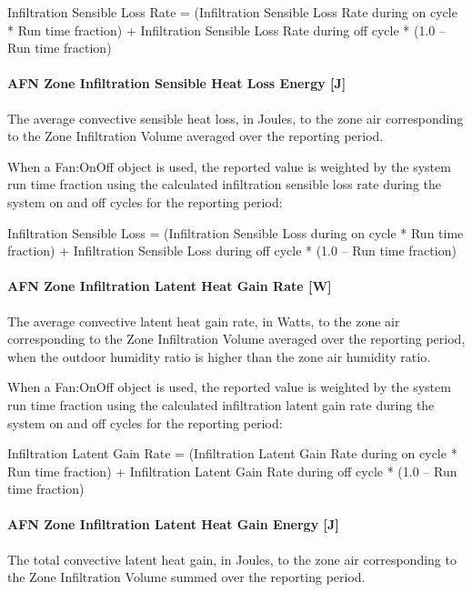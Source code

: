 Infiltration Sensible Loss Rate = (Infiltration Sensible Loss Rate during on cycle * Run time fraction) + Infiltration Sensible Loss Rate during off cycle * (1.0 -- Run time fraction)

\paragraph{AFN Zone Infiltration Sensible Heat Loss Energy {[}J{]}}\label{afn-zone-infiltration-sensible-heat-loss-energy-j}

The average convective sensible heat loss, in Joules, to the zone air corresponding to the Zone Infiltration Volume averaged over the reporting period.

When a Fan:OnOff object is used, the reported value is weighted by the system run time fraction using the calculated infiltration sensible loss rate during the system on and off cycles for the reporting period:

Infiltration Sensible Loss = (Infiltration Sensible Loss during on cycle * Run time fraction) + Infiltration Sensible Loss during off cycle * (1.0 -- Run time fraction)

\paragraph{AFN Zone Infiltration Latent Heat Gain Rate {[}W{]}}\label{afn-zone-infiltration-latent-heat-gain-rate-w}

The average convective latent heat gain rate, in Watts, to the zone air corresponding to the Zone Infiltration Volume averaged over the reporting period, when the outdoor humidity ratio is higher than the zone air humidity ratio.

When a Fan:OnOff object is used, the reported value is weighted by the system run time fraction using the calculated infiltration latent gain rate during the system on and off cycles for the reporting period:

Infiltration Latent Gain Rate = (Infiltration Latent Gain Rate during on cycle * Run time fraction) + Infiltration Latent Gain Rate during off cycle * (1.0 -- Run time fraction)

\paragraph{AFN Zone Infiltration Latent Heat Gain Energy {[}J{]}}\label{afn-zone-infiltration-latent-heat-gain-energy-j}

The total convective latent heat gain, in Joules, to the zone air corresponding to the Zone Infiltration Volume summed over the reporting period.

